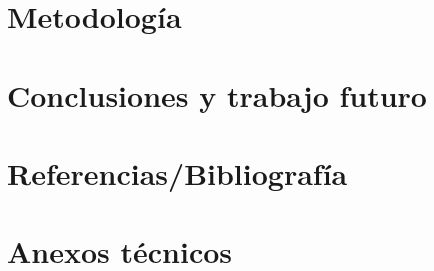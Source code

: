 \documentclass{book}
\begin{document}
	\part{Metodología}
	
	
	
	
	

	\part{Conclusiones y trabajo futuro}
	
	
	\part{Referencias/Bibliografía}
	
	
	\part{Anexos técnicos}
	\appendix
	
	
	
	
\end{document}
